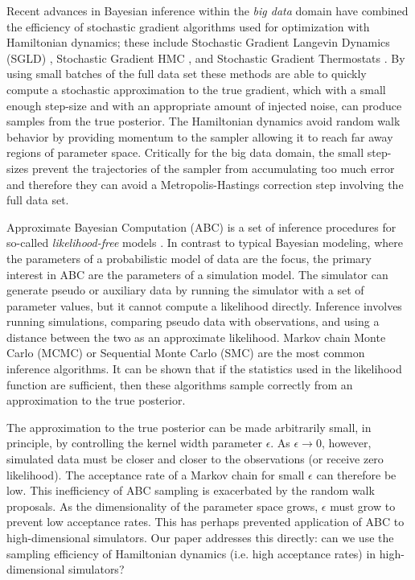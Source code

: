 \documentclass[]{article}
\begin{document}
Recent advances in Bayesian inference within the {\em big data} domain have combined the efficiency of stochastic gradient algorithms used for optimization with Hamiltonian dynamics;  these include Stochastic Gradient Langevin Dynamics (SGLD) \cite{welling2011bayesian}, Stochastic Gradient HMC \cite{chen2014stochastic}, and Stochastic Gradient Thermostats \cite{ding2014bayesian}.
By using small batches of the full data set these methods are able to quickly compute a stochastic approximation to the true gradient, which with a small enough step-size and with an appropriate amount of injected noise, can produce samples from the true posterior.  The Hamiltonian dynamics avoid random walk behavior by providing momentum to the sampler allowing it to reach far away regions of parameter space.  Critically for the big data domain, the small step-sizes prevent the trajectories of the sampler from accumulating too much error and therefore they can avoid a Metropolis-Hastings correction step involving the full data set.

Approximate Bayesian Computation (ABC) is a set of inference procedures for so-called {\em likelihood-free} models \cite{abccitations}.  In contrast to typical Bayesian modeling, where the parameters of a probabilistic model of data are the focus, the primary interest in ABC are the parameters of a simulation model.  The simulator can generate pseudo or auxiliary data by running the simulator with a set of parameter values, but it cannot compute a likelihood directly.  Inference involves running simulations, comparing pseudo data with observations, and using a distance between the two as an approximate likelihood.  Markov chain Monte Carlo (MCMC) or Sequential Monte Carlo (SMC) are the most common inference algorithms.  It can be shown that if the statistics used in the likelihood function are sufficient, then these algorithms sample correctly from an approximation to the true posterior.

The approximation to the true posterior can be made arbitrarily small, in principle, by controlling the kernel width parameter $\epsilon$.  As $\epsilon \rightarrow 0$, however, simulated data must be closer and closer to the observations (or receive zero likelihood).  The acceptance rate of a Markov chain for small $\epsilon$ can therefore be low.  This inefficiency of ABC sampling is exacerbated by the random walk proposals.  As the dimensionality of the parameter space grows,  $\epsilon$ must grow to prevent low acceptance rates.  This has perhaps prevented application of ABC to high-dimensional simulators.  Our paper addresses this directly: can we use the sampling efficiency of Hamiltonian dynamics (i.e. high acceptance rates) in high-dimensional simulators? 
\end{document}
